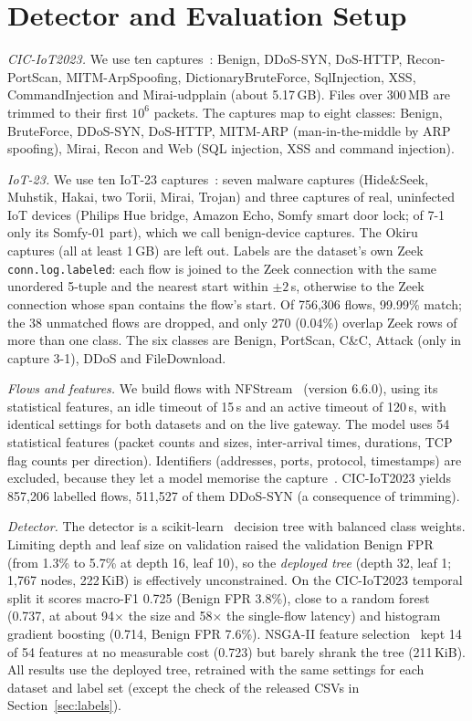 \section{Detector and Evaluation Setup}\label{sec:setup}

\emph{CIC-IoT2023.} We use ten captures~\cite{neto2023ciciot2023}: Benign, DDoS-SYN, DoS-HTTP, Recon-PortScan, MITM-ArpSpoofing, DictionaryBruteForce, SqlInjection, XSS, CommandInjection and Mirai-udpplain (about 5.17\,GB). Files over 300\,MB are trimmed to their first $10^6$ packets. The captures map to eight classes: Benign, BruteForce, DDoS-SYN, DoS-HTTP, MITM-ARP (man-in-the-middle by ARP spoofing), Mirai, Recon and Web (SQL injection, XSS and command injection).

\emph{IoT-23.} We use ten IoT-23 captures~\cite{garcia2020iot23}: seven malware captures (Hide\&Seek, Muhstik, Hakai, two Torii, Mirai, Trojan) and three captures of real, uninfected IoT devices (Philips Hue bridge, Amazon Echo, Somfy smart door lock; of 7-1 only its Somfy-01 part), which we call benign-device captures. The Okiru captures (all at least 1\,GB) are left out. Labels are the dataset's own Zeek \texttt{conn.log.labeled}: each flow is joined to the Zeek connection with the same unordered 5-tuple and the nearest start within $\pm2$\,s, otherwise to the Zeek connection whose span contains the flow's start. Of 756,306 flows, 99.99\% match; the 38 unmatched flows are dropped, and only 270 (0.04\%) overlap Zeek rows of more than one class. The six classes are Benign, PortScan, C\&C, Attack (only in capture 3-1), DDoS and FileDownload.

\emph{Flows and features.} We build flows with NFStream~\cite{aouini2022nfstream} (version 6.6.0), using its statistical features, an idle timeout of 15\,s and an active timeout of 120\,s, with identical settings for both datasets and on the live gateway. The model uses 54 statistical features (packet counts and sizes, inter-arrival times, durations, TCP flag counts per direction). Identifiers (addresses, ports, protocol, timestamps) are excluded, because they let a model memorise the capture~\cite{arp2022dos}. CIC-IoT2023 yields 857,206 labelled flows, 511,527 of them DDoS-SYN (a consequence of trimming).

\emph{Detector.} The detector is a scikit-learn~\cite{pedregosa2011sklearn} decision tree with balanced class weights. Limiting depth and leaf size on validation raised the validation Benign FPR (from 1.3\% to 5.7\% at depth 16, leaf 10), so the \emph{deployed tree} (depth 32, leaf 1; 1,767 nodes, 222\,KiB) is effectively unconstrained. On the CIC-IoT2023 temporal split it scores macro-F1 0.725 (Benign FPR 3.8\%), close to a random forest (0.737, at about 94$\times$ the size and 58$\times$ the single-flow latency) and histogram gradient boosting (0.714, Benign FPR 7.6\%). NSGA-II feature selection~\cite{deb2002nsga2,blank2020pymoo} kept 14 of 54 features at no measurable cost (0.723) but barely shrank the tree (211\,KiB). All results use the deployed tree, retrained with the same settings for each dataset and label set (except the check of the released CSVs in Section~\ref{sec:labels}).

